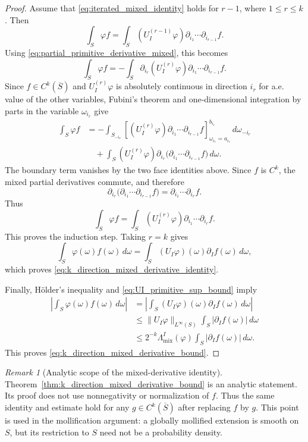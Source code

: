 \documentclass[11pt,letterpaper]{article}
\theoremstyle{definition}
\theoremstyle{remark}
\newtheorem{remark}[theorem]{Remark}
\begin{document}
\begin{proof}
Assume that \eqref{eq:iterated_mixed_identity} holds for $r-1$, where
$1\le r\le k$. Then
$$
\int_S\varphi f
=
\int_S
(U_I^{(r-1)}\varphi)
\partial_{i_1}\cdots\partial_{i_{r-1}}f.
$$
Using \eqref{eq:partial_primitive_derivative_mixed}, this becomes
$$
\int_S\varphi f
=
-\int_S
\partial_{i_r}(U_I^{(r)}\varphi)
\partial_{i_1}\cdots\partial_{i_{r-1}}f.
$$
Since $f\in C^k(\overline S)$ and $U_I^{(r)}\varphi$ is absolutely continuous
in direction $i_r$ for a.e. value of the other variables, Fubini's theorem and
one-dimensional integration by parts in the variable $\omega_{i_r}$ give
$$
\begin{aligned}
\int_S\varphi f
&=
-\int_{S_{-i_r}}
\left[
(U_I^{(r)}\varphi)
\partial_{i_1}\cdots\partial_{i_{r-1}}f
\right]_{\omega_{i_r}=a_{i_r}}^{b_{i_r}}
\,d\omega_{-i_r}
\\
&\quad
+
\int_S
(U_I^{(r)}\varphi)
\partial_{i_r}
\bigl(
\partial_{i_1}\cdots\partial_{i_{r-1}}f
\bigr)
\,d\omega.
\end{aligned}
$$
The boundary term vanishes by the two face identities above. Since $f$ is
$C^k$, the mixed partial derivatives commute, and therefore
$$
\partial_{i_r}
\bigl(
\partial_{i_1}\cdots\partial_{i_{r-1}}f
\bigr)
=
\partial_{i_1}\cdots\partial_{i_r}f.
$$
Thus
$$
\int_S\varphi f
=
\int_S
(U_I^{(r)}\varphi)
\partial_{i_1}\cdots\partial_{i_r}f.
$$
This proves the induction step. Taking $r=k$ gives
$$
\int_S\varphi(\omega)f(\omega)\,d\omega
=
\int_S
(U_I\varphi)(\omega)\partial_I f(\omega)\,d\omega,
$$
which proves \eqref{eq:k_direction_mixed_derivative_identity}.

Finally, Hölder's inequality and \eqref{eq:UI_primitive_sup_bound} imply
$$
\begin{aligned}
\left|
\int_S\varphi(\omega)f(\omega)\,d\omega
\right|
&=
\left|
\int_S
(U_I\varphi)(\omega)\partial_I f(\omega)\,d\omega
\right|
\\
&\le
\|U_I\varphi\|_{L^\infty(S)}
\int_S|\partial_I f(\omega)|\,d\omega
\\
&\le
2^{-k}\Lambda_{\mathrm{mix}}^I(\varphi)
\int_S|\partial_I f(\omega)|\,d\omega.
\end{aligned}
$$
This proves \eqref{eq:k_direction_mixed_derivative_bound}.
\end{proof}

\begin{remark}[Analytic scope of the mixed-derivative identity]
\label{rem:analytic_scope_mixed_derivative}
Theorem~\ref{thm:k_direction_mixed_derivative_bound} is an analytic statement.
Its proof does not use nonnegativity or normalization of $f$. Thus the same
identity and estimate hold for any $g\in C^k(\overline S)$ after replacing
$f$ by $g$. This point is used in the mollification argument: a globally
mollified extension is smooth on $S$, but its restriction to $S$ need not be a
probability density.
\end{remark}
\end{document}
